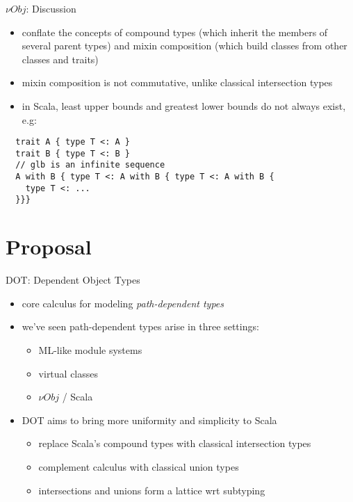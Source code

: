 \documentclass{beamer}
\begin{document}
\begin{frame}[fragile]{${\nu}Obj$: Discussion}
\begin{itemize}
\item conflate the concepts of compound types (which inherit the
  members of several parent types) and mixin composition (which build
  classes from other classes and traits)
\item mixin composition is not commutative, unlike classical
  intersection types
\item in Scala, least upper bounds and greatest lower bounds do not always exist, e.g: %
\end{itemize}
\begin{verbatim}
  trait A { type T <: A }
  trait B { type T <: B }
  // glb is an infinite sequence
  A with B { type T <: A with B { type T <: A with B {
    type T <: ...
  }}}
\end{verbatim}
\end{frame}

\section{Proposal}
\begin{frame}{DOT: Dependent Object Types}
\begin{itemize}
\item core calculus for modeling {\it path-dependent types}
\item we've seen path-dependent types arise in three settings:
\begin{itemize}
\item ML-like module systems
\item virtual classes
\item ${\nu}Obj$ / Scala
\end{itemize}
\item DOT aims to bring more uniformity and simplicity to Scala
\begin{itemize}
\item replace Scala's compound types with classical intersection types
\item complement calculus with classical union types
\item intersections and unions form a lattice wrt subtyping
\end{itemize}
\end{itemize}
\end{frame}
\end{document}
